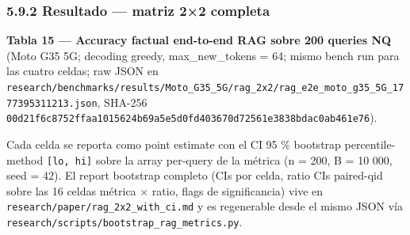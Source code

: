 \subsubsection{5.9.2 Resultado --- matriz 2×2
completa}\label{resultado-matriz-22-completa}

\textbf{Tabla 15 --- Accuracy factual end-to-end RAG sobre 200 queries NQ} (Moto
G35 5G; decoding greedy, max\_new\_tokens = 64; mismo bench run para las cuatro
celdas; raw JSON en
\texttt{research/benchmarks/results/Moto\_G35\_5G/rag\_2x2/rag\_e2e\_moto\_g35\_5G\_1777395311213.json},
SHA-256
\texttt{00d21f6c8752ffaa1015624b69a5e5d0fd403670d72561e3838bdac0ab461e76}).

Cada celda se reporta como point estimate con el CI 95 \% bootstrap
percentile-method \texttt{{[}lo,\ hi{]}} sobre la array per-query de la métrica
(n = 200, B = 10 000, seed = 42). El report bootstrap completo (CIs por celda,
ratio CIs paired-qid sobre las 16 celdas métrica × ratio, flags de
significancia) vive en \texttt{research/paper/rag\_2x2\_with\_ci.md} y es
regenerable desde el mismo JSON vía
\texttt{research/scripts/bootstrap\_rag\_metrics.py}.

